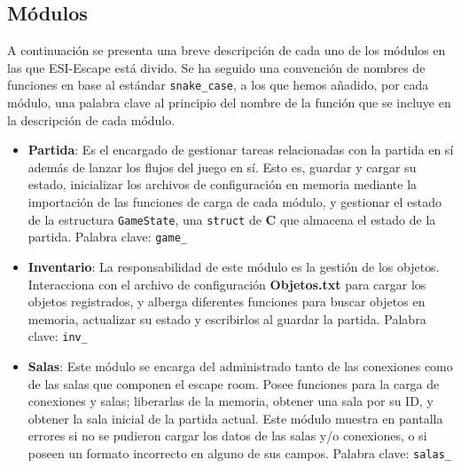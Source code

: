 \subsection{Módulos}

A continuación se presenta una breve descripción de cada uno de los módulos en las que ESI-Escape está divido. Se ha seguido una 
convención de nombres de funciones en base al estándar \texttt{snake\_case}, a los que hemos añadido, por cada módulo, una
palabra clave al principio del nombre de la función que se incluye en la descripción de cada módulo.

\begin{itemize}

	\item \textbf{Partida}: Es el encargado de gestionar tareas relacionadas con la 
	partida en sí además de lanzar los flujos del juego en sí. Esto es, guardar y cargar su estado, 
	inicializar los archivos de configuración en memoria mediante
	la importación de las funciones de carga de cada módulo, y gestionar el estado de
	la estructura \texttt{GameState}, una \texttt{struct} de \textbf{C} que almacena el estado de la partida. Palabra
	clave: \texttt{game\_}
	
	\item \textbf{Inventario}: La responsabilidad de este módulo es la gestión de los objetos. Interacciona con el archivo de configuración
	\textbf{Objetos.txt} para cargar los objetos registrados, y alberga diferentes funciones para buscar objetos en memoria, actualizar su estado
	y escribirlos al guardar la partida. Palabra clave: \texttt{inv\_}

	\item \textbf{Salas}: Este módulo se encarga del administrado tanto de las conexiones como de las salas 
	que componen el escape room. Posee funciones para la carga de conexiones y salas; liberarlas de la memoria, 
	obtener una sala por su ID, y obtener la sala inicial de la partida actual. Este módulo muestra en pantalla errores 
	si no se pudieron cargar los datos de las salas y/o conexiones, o si poseen un formato incorrecto en alguno de sus campos. 
	Palabra clave: \texttt{salas\_}


\end{itemize}
